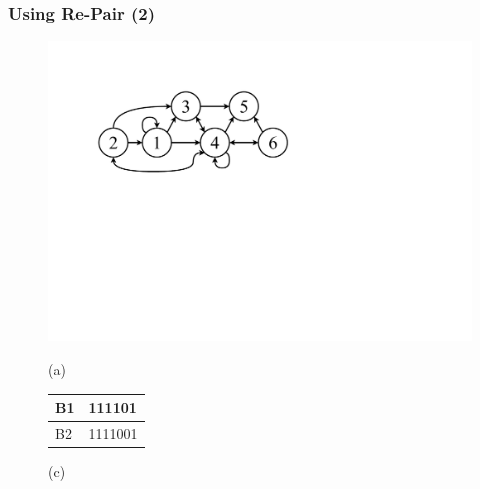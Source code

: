 \begin{frame}
\frametitle{Using Re-Pair (2)}

\begin{figure}%
    	\centering
    	\begin{minipage}{1\textwidth}
    		\begin{minipage}{.6\textwidth}
    			\centering
    			\includegraphics[scale=.2, clip,  trim=90 330 350 90]{../img/arte/graphs-repair.pdf}
    		
    			(a)
    		\end{minipage}
    		\begin{minipage}{.35\textwidth}
    			\centering
    			\footnotesize
    			\vspace{5mm}
		    	\begin{tabular}{|l|l|}
		    		\hline
		    		B1 & 111101 \\
		    		\hline
		    		B2 & 1111001\\
		    		\hline
		    	\end{tabular}
		    	\vspace{5mm}
		    	
    			(c)
    		\end{minipage}
    	\end{minipage}
    	\vspace{5mm}
    	
    	\begin{minipage}{1\textwidth}
    		\centering
    		\normalsize


\end{minipage}
\end{figure}
\end{frame}
